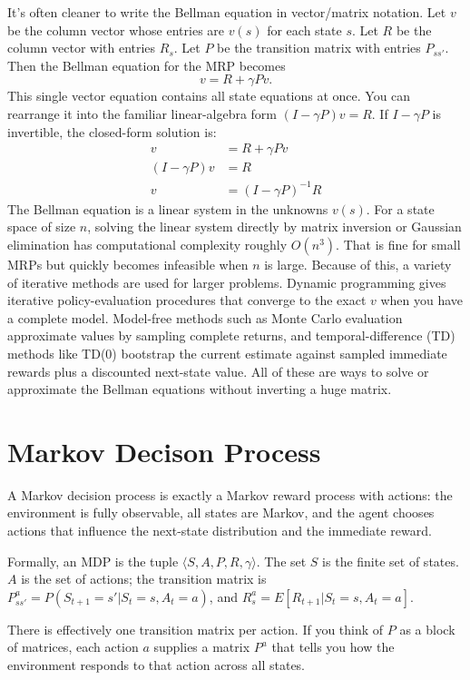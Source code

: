 It’s often cleaner to write the Bellman equation in vector/matrix notation. Let $v$ be the column vector whose entries are $v(s)$ for each state 
$s$. Let $R$ be the column vector with entries $R_s$. Let $P$ be the transition matrix with entries $P_{ss'}$. Then the Bellman equation for the MRP becomes 
\begin{equation*}
    v=R+\gamma Pv.
\end{equation*}
This single vector equation contains all state equations at once. You can rearrange it into the familiar linear-algebra form $(I-\gamma P)v=R$.
If $I-\gamma P$ is invertible, the closed-form solution is:
\begin{align*}
    v&=R+\gamma Pv\\
    (I-\gamma P)v&=R\\
    v&=(I-\gamma P)^{-1}R
\end{align*}
The Bellman equation is a linear system in the unknowns $v(s)$. For a state space of size $n$, solving the linear system directly by matrix inversion or Gaussian elimination has computational complexity roughly $O(n^3)$. That is fine for small MRPs but quickly becomes infeasible when 
$n$ is large.
Because of this, a variety of iterative methods are used for larger problems. Dynamic programming gives iterative policy-evaluation procedures that converge to the exact $v$ when you have a complete model. Model-free methods such as Monte Carlo evaluation approximate values by sampling complete returns, and temporal-difference (TD) methods like TD(0) bootstrap the current estimate against sampled immediate rewards plus a discounted next-state value. All of these are ways to solve or approximate the Bellman equations without inverting a huge matrix.

\section{Markov Decison Process}
A Markov decision process is exactly a Markov reward process with actions: the environment is fully observable, all states are Markov, and the agent chooses actions that influence the next-state distribution and the immediate reward.

Formally, an MDP is the tuple $\langle S,A,P,R,\gamma\rangle$. The set $S$ is the finite set of states. $A$ is the set of actions; the transition matrix is $P_{ss'}^a = P(S_{t+1}=s'|S_t=s,A_t=a)$, and $R_s^a = E[R_{t+1}|S_t=s,A_t=a]$.

There is effectively one transition matrix per action. If you think of $P$ as a block of matrices, each action $a$ supplies a matrix $P^a$ that tells you how the environment responds to that action across all states.

